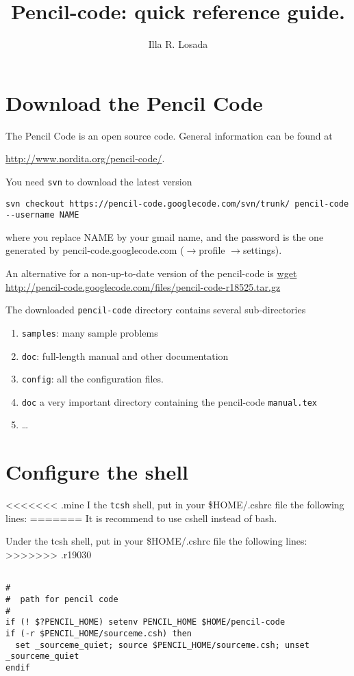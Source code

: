 \documentclass[a4paper,12pt]{article}
\title{Pencil-code: quick reference guide.}
\author{Illa R. Losada}
\date{}
\begin{document}
\maketitle

\tableofcontents

\newpage

\section{Download the Pencil Code}
The Pencil Code is an open source code. General information can be found at

\url{http://www.nordita.org/pencil-code/}.


You need \verb|svn| to download the latest version 
\begin{verbatim}
svn checkout https://pencil-code.googlecode.com/svn/trunk/ pencil-code
--username NAME
\end{verbatim}

where you replace NAME by your gmail name, and the password is the
one generated by pencil-code.googlecode.com ($\rightarrow$profile
$\rightarrow$settings). 

An alternative for a non-up-to-date version of the pencil-code is
\url{
wget http://pencil-code.googlecode.com/files/pencil-code-r18525.tar.gz
}

The downloaded \verb|pencil-code| directory contains several sub-directories
\begin{enumerate}
  \item \verb|samples|:  many sample problems
  \item \verb|doc|: full-length manual and other documentation
  \item \verb|config|: all the configuration files.
  \item \verb|doc| a very important directory containing the pencil-code
    \verb|manual.tex|
  \item \dots
\end{enumerate}

\section{Configure the shell}

<<<<<<< .mine
I the \verb|tcsh| shell, put in your \$HOME/.cshrc file the following lines:
=======
It is recommend to use cshell instead of bash.

Under the tcsh shell, put in your \$HOME/.cshrc file the following lines:
>>>>>>> .r19030
\begin{verbatim}

#
#  path for pencil code
#
if (! $?PENCIL_HOME) setenv PENCIL_HOME $HOME/pencil-code
if (-r $PENCIL_HOME/sourceme.csh) then
  set _sourceme_quiet; source $PENCIL_HOME/sourceme.csh; unset _sourceme_quiet
endif
\end{verbatim}
\end{document}
